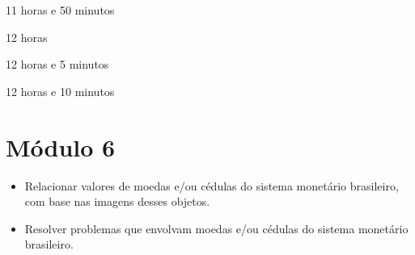 \begin{escolha}
\item
  11 horas e 50 minutos
\item
  12 horas
\item
  12 horas e 5 minutos
\item
  12 horas e 10 minutos
\end{escolha}


\chapter{Módulo 6}


\begin{itemize}
\item Relacionar valores de moedas e/ou cédulas do sistema monetário
brasileiro, com base nas imagens desses objetos.

\item Resolver problemas que envolvam moedas e/ou cédulas do sistema
monetário brasileiro.
\end{itemize}

